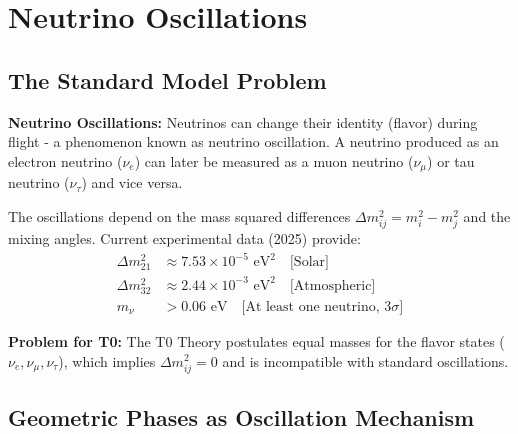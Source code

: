 	\section{Neutrino Oscillations}
	
	\subsection{The Standard Model Problem}
	
	\begin{warning}
		\textbf{Neutrino Oscillations:} Neutrinos can change their identity (flavor) during flight - a phenomenon known as neutrino oscillation. A neutrino produced as an electron neutrino ($\nu_e$) can later be measured as a muon neutrino ($\nu_\mu$) or tau neutrino ($\nu_\tau$) and vice versa.
		
		The oscillations depend on the mass squared differences $\Delta m^2_{ij} = m_i^2 - m_j^2$ and the mixing angles. Current experimental data (2025) provide:
		\begin{align}
			\Delta m^2_{21} &\approx 7.53 \times 10^{-5} \text{ eV}^2 \quad \text{[Solar]} \\
			\Delta m^2_{32} &\approx 2.44 \times 10^{-3} \text{ eV}^2 \quad \text{[Atmospheric]} \\
			m_\nu &> 0.06 \text{ eV} \quad \text{[At least one neutrino, 3}\sigma\text{]}
		\end{align}
		
		\textbf{Problem for T0:}
		The T0 Theory postulates equal masses for the flavor states ($\nu_e, \nu_\mu, \nu_\tau$), which implies $\Delta m^2_{ij} = 0$ and is incompatible with standard oscillations.
	\end{warning}
	
	\subsection{Geometric Phases as Oscillation Mechanism}
	
